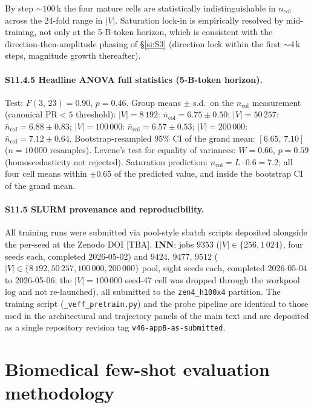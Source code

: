 \documentclass[11pt,a4paper]{article}
\begin{document}
By step $\sim\!100$\,k the four mature cells are statistically
indistinguishable in $n_\mathrm{col}$ across the 24-fold range in
$|V|$. Saturation lock-in is empirically resolved by mid-training,
not only at the 5-B-token horizon, which is consistent with the
direction-then-amplitude phasing of \S\ref{si:S3} (direction lock
within the first $\sim\!4$\,k steps, magnitude growth thereafter).

\paragraph{S11.4.5 Headline ANOVA full statistics (5-B-token horizon).}
Test:
$F(3,\,23)\!=\!0.90$, $p\!=\!0.46$.
Group means $\pm$ s.d.\ on the $n_\mathrm{col}$ measurement (canonical
PR$\!<\!5$ threshold):
$|V|\!=\!8\,192$: $\bar n_\mathrm{col}\!=\!6.75 \pm 0.50$;
$|V|\!=\!50\,257$: $\bar n_\mathrm{col}\!=\!6.88 \pm 0.83$;
$|V|\!=\!100\,000$: $\bar n_\mathrm{col}\!=\!6.57 \pm 0.53$;
$|V|\!=\!200\,000$: $\bar n_\mathrm{col}\!=\!7.12 \pm 0.64$.
Bootstrap-resampled 95\% CI of the grand mean:
$[6.65,\,7.10]$ ($n\!=\!10\,000$ resamples).
Levene's test for equality of variances: $W\!=\!0.66$,
$p\!=\!0.59$ (homoscedasticity not rejected).
Saturation prediction: $n_\mathrm{col}\!=\!L\!\cdot\!0.6\!=\!7.2$;
all four cell means within $\pm 0.65$ of the predicted value, and
inside the bootstrap CI of the grand mean.

\paragraph{S11.5 SLURM provenance and reproducibility.}
All training runs were submitted via pool-style sbatch scripts
deposited alongside the per-seed  at the
Zenodo DOI [TBA].
\textbf{INN}: jobs $9353$ ($|V|\!\in\!\{256, 1\,024\}$, four
seeds each, completed 2026-05-02) and $9424$, $9477$, $9512$
($|V|\!\in\!\{8\,192, 50\,257, 100\,000, 200\,000\}$ pool, eight
seeds each, completed 2026-05-04 to 2026-05-06; the
$|V|\!=\!100\,000$ seed-47 cell was dropped through the workpool
log and not re-launched), all submitted to the
\texttt{zen4\_h100x4} partition.
The training script (\texttt{\_veff\_pretrain.py}) and the
probe pipeline are identical to those used in the architectural
and trajectory panels of the main text and are deposited as a
single repository revision tag \texttt{v46-appB-as-submitted}.

\section{Biomedical few-shot evaluation methodology}
\label{si:S12}
\end{document}
